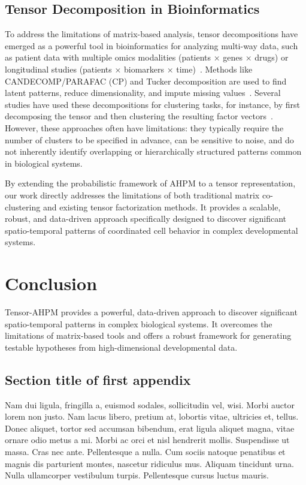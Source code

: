 \documentclass[unnumsec,webpdf,contemporary,large,namedate]{oup-authoring-template}%
\theoremstyle{thmstyleone}%
\theoremstyle{thmstyletwo}%
\theoremstyle{thmstylethree}%
\begin{document}
\subsection{Tensor Decomposition in Bioinformatics}
To address the limitations of matrix-based analysis, tensor decompositions have emerged as a powerful tool in bioinformatics for analyzing multi-way data, such as patient data with multiple omics modalities (patients × genes × drugs) or longitudinal studies (patients × biomarkers × time)~\citep{kolda2009TensorDecompositionsApplications}. Methods like CANDECOMP/PARAFAC (CP) and Tucker decomposition are used to find latent patterns, reduce dimensionality, and impute missing values~\citep{yu2025OptimizationMethodsTensor}. Several studies have used these decompositions for clustering tasks, for instance, by first decomposing the tensor and then clustering the resulting factor vectors~\citep{cheng2019TensorBasedLowDimensionalRepresentation}. However, these approaches often have limitations: they typically require the number of clusters to be specified in advance, can be sensitive to noise, and do not inherently identify overlapping or hierarchically structured patterns common in biological systems.

By extending the probabilistic framework of AHPM to a tensor representation, our work directly addresses the limitations of both traditional matrix co-clustering and existing tensor factorization methods. It provides a scalable, robust, and data-driven approach specifically designed to discover significant spatio-temporal patterns of coordinated cell behavior in complex developmental systems.

\section{Conclusion}
Tensor-AHPM provides a powerful, data-driven approach to discover significant spatio-temporal patterns in complex biological systems. It overcomes the limitations of matrix-based tools and offers a robust framework for generating testable hypotheses from high-dimensional developmental data.


\begin{appendices}

\section{Section title of first appendix}\label{sec11}

Nam dui ligula, fringilla a, euismod sodales, sollicitudin vel, wisi. Morbi auctor lorem non justo. Nam lacus libero,
pretium at, lobortis vitae, ultricies et, tellus. Donec aliquet, tortor sed accumsan bibendum, erat ligula aliquet magna,
vitae ornare odio metus a mi. Morbi ac orci et nisl hendrerit mollis. Suspendisse ut massa. Cras nec ante. Pellentesque
a nulla. Cum sociis natoque penatibus et magnis dis parturient montes, nascetur ridiculus mus. Aliquam tincidunt
urna. Nulla ullamcorper vestibulum turpis. Pellentesque cursus luctus mauris.

\end{appendices}
\end{document}

